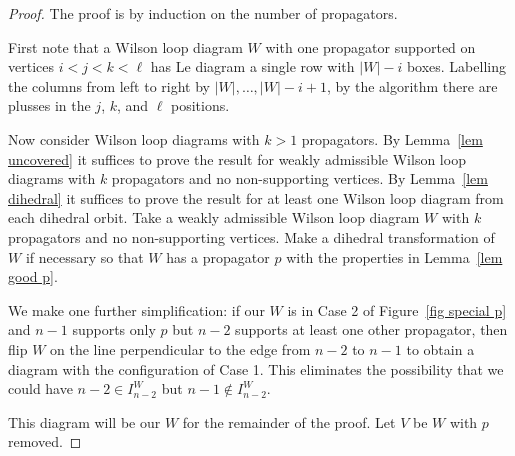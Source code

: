 \documentclass[11pt]{article}
\theoremstyle{remark}
\theoremstyle{definition}
\begin{document}
\begin{proof}
  The proof is by induction on the number of propagators.

  First note that a Wilson loop diagram $W$ with one propagator supported on vertices $i<j<k<\ell$ has Le diagram a single row with $|W|-i$ boxes.  Labelling the columns from left to right by $|W|, \ldots, |W|-i+1$, by the algorithm there are plusses in the $j$, $k$, and $\ell$ positions.

  Now consider Wilson loop diagrams with $k>1$ propagators.  By Lemma~\ref{lem uncovered} it suffices to prove the result for weakly admissible Wilson loop diagrams with $k$ propagators and no non-supporting vertices.  By Lemma~\ref{lem dihedral} it suffices to prove the result for at least one Wilson loop diagram from each dihedral orbit.  Take a weakly admissible Wilson loop diagram $W$ with $k$ propagators and no non-supporting vertices.  Make a dihedral transformation of $W$ if necessary so that $W$ has a propagator $p$ with the properties in Lemma~\ref{lem good p}.  

  We make one further simplification: if our $W$ is in Case 2 of Figure~\ref{fig special p} and $n-1$ supports only $p$ but $n-2$ supports at least one other propagator, then flip $W$ on the line perpendicular to the edge from $n-2$ to $n-1$ to obtain a diagram with the configuration of Case 1. This eliminates the possibility that we could have $n-2 \in I_{n-2}^W$ but $n-1 \not\in I_{n-2}^W$. 

  This diagram will be our $W$ for the remainder of the proof. Let $V$ be $W$ with $p$ removed. 


\end{proof}
\end{document}
